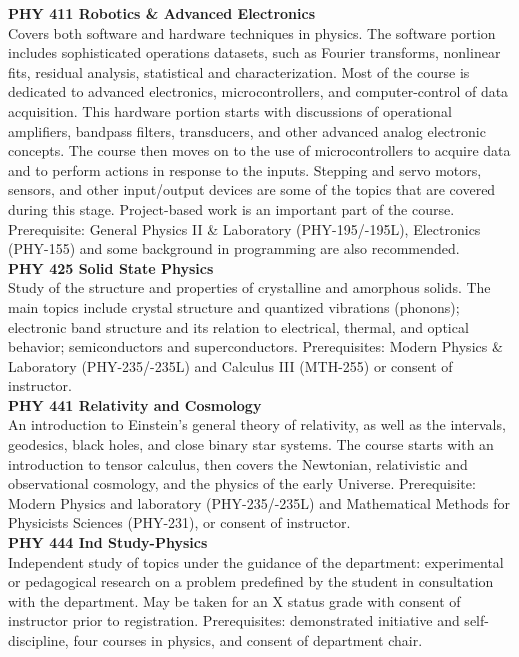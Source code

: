 \documentclass[
  letterpaper,
]{scrbook}
\begin{document}
\textbf{PHY 411 Robotics \& Advanced Electronics}\\
Covers both software and hardware techniques in physics. The software
portion includes sophisticated operations datasets, such as Fourier
transforms, nonlinear fits, residual analysis, statistical and
characterization. Most of the course is dedicated to advanced
electronics, microcontrollers, and computer-control of data acquisition.
This hardware portion starts with discussions of operational amplifiers,
bandpass filters, transducers, and other advanced analog electronic
concepts. The course then moves on to the use of microcontrollers to
acquire data and to perform actions in response to the inputs. Stepping
and servo motors, sensors, and other input/output devices are some of
the topics that are covered during this stage. Project-based work is an
important part of the course. Prerequisite: General Physics II \&
Laboratory (PHY-195/-195L), Electronics (PHY-155) and some background in
programming are also recommended.\\
\textbf{PHY 425 Solid State Physics}\\
Study of the structure and properties of crystalline and amorphous
solids. The main topics include crystal structure and quantized
vibrations (phonons); electronic band structure and its relation to
electrical, thermal, and optical behavior; semiconductors and
superconductors. Prerequisites: Modern Physics \& Laboratory
(PHY-235/-235L) and Calculus III (MTH-255) or consent of instructor.\\
\textbf{PHY 441 Relativity and Cosmology}\\
An introduction to Einstein's general theory of relativity, as well as
the intervals, geodesics, black holes, and close binary star systems.
The course starts with an introduction to tensor calculus, then covers
the Newtonian, relativistic and observational cosmology, and the physics
of the early Universe. Prerequisite: Modern Physics and laboratory
(PHY-235/-235L) and Mathematical Methods for Physicists Sciences
(PHY-231), or consent of instructor.\\
\textbf{PHY 444 Ind Study-Physics}\\
Independent study of topics under the guidance of the department:
experimental or pedagogical research on a problem predefined by the
student in consultation with the department. May be taken for an X
status grade with consent of instructor prior to registration.
Prerequisites: demonstrated initiative and self-discipline, four courses
in physics, and consent of department chair.\\
\end{document}
